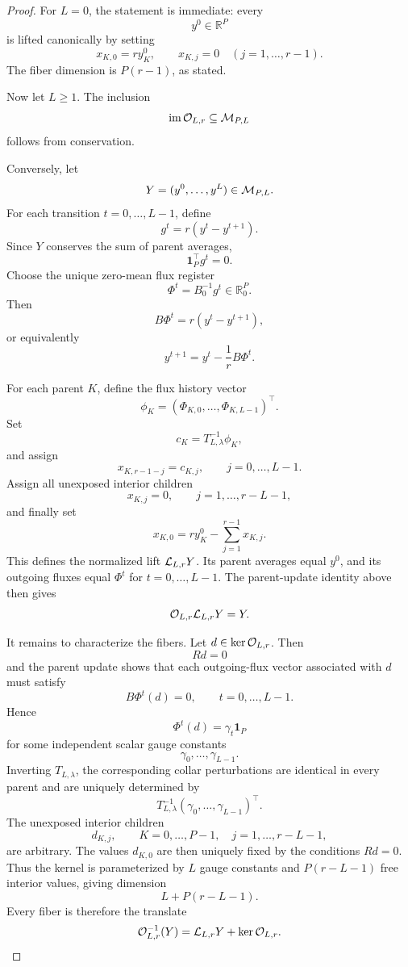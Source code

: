 \documentclass[11pt]{article}
\newcommand{\R}{\mathbb R}
\DeclareMathOperator{\im}{im}
\begin{document}
\begin{proof}
For \(L=0\), the statement is immediate: every
\[
  y^0\in\R^P
\]
is lifted canonically by setting
\[
  x_{K,0}=r y_K^0,
  \qquad
  x_{K,j}=0\quad(j=1,\ldots,r-1).
\]
The fiber dimension is \(P(r-1)\), as stated.

Now let \(L\ge1\).  The inclusion
\[
  \im{\cal O}_{L,r}\subseteq{\cal M}_{P,L}
\]
follows from conservation.

Conversely, let
\[
  Y=(y^0,\ldots,y^L)\in{\cal M}_{P,L}.
\]
For each transition \(t=0,\ldots,L-1\), define
\[
  g^t=r(y^t-y^{t+1}).
\]
Since \(Y\) conserves the sum of parent averages,
\[
  \mathbf 1_P^\top g^t=0.
\]
Choose the unique zero-mean flux register
\[
  \Phi^t=B_0^{-1}g^t\in\R_0^P.
\]
Then
\[
  B\Phi^t=r(y^t-y^{t+1}),
\]
or equivalently
\[
  y^{t+1}=y^t-\frac1rB\Phi^t.
\]

For each parent \(K\), define the flux history vector
\[
  \phi_K
  =
  (\Phi_{K,0},\ldots,\Phi_{K,L-1})^\top.
\]
Set
\[
  c_K=T_{L,\lambda}^{-1}\phi_K,
\]
and assign
\[
  x_{K,r-1-j}=c_{K,j},
  \qquad j=0,\ldots,L-1.
\]
Assign all unexposed interior children
\[
  x_{K,j}=0,
  \qquad j=1,\ldots,r-L-1,
\]
and finally set
\[
  x_{K,0}
  =
  r y_K^0-\sum_{j=1}^{r-1}x_{K,j}.
\]
This defines the normalized lift \({\cal L}_{L,r}Y\).  Its parent averages
equal \(y^0\), and its outgoing fluxes equal \(\Phi^t\) for
\(t=0,\ldots,L-1\).  The parent-update identity above then gives
\[
  {\cal O}_{L,r}{\cal L}_{L,r}Y=Y.
\]

It remains to characterize the fibers.  Let \(d\in\ker{\cal O}_{L,r}\).
Then
\[
  Rd=0
\]
and the parent update shows that each outgoing-flux vector associated with
\(d\) must satisfy
\[
  B\Phi^t(d)=0,
  \qquad t=0,\ldots,L-1.
\]
Hence
\[
  \Phi^t(d)=\gamma_t\mathbf 1_P
\]
for some independent scalar gauge constants
\[
  \gamma_0,\ldots,\gamma_{L-1}.
\]
Inverting \(T_{L,\lambda}\), the corresponding collar perturbations are
identical in every parent and are uniquely determined by
\[
  T_{L,\lambda}^{-1}
  (\gamma_0,\ldots,\gamma_{L-1})^\top.
\]
The unexposed interior children
\[
  d_{K,j},
  \qquad
  K=0,\ldots,P-1,
  \quad
  j=1,\ldots,r-L-1,
\]
are arbitrary.  The values \(d_{K,0}\) are then uniquely fixed by the
conditions \(Rd=0\).  Thus the kernel is parameterized by \(L\) gauge
constants and \(P(r-L-1)\) free interior values, giving dimension
\[
  L+P(r-L-1).
\]
Every fiber is therefore the translate
\[
  {\cal O}_{L,r}^{-1}(Y)
  =
  {\cal L}_{L,r}Y+\ker{\cal O}_{L,r}.
\]
\end{proof}
\end{document}
